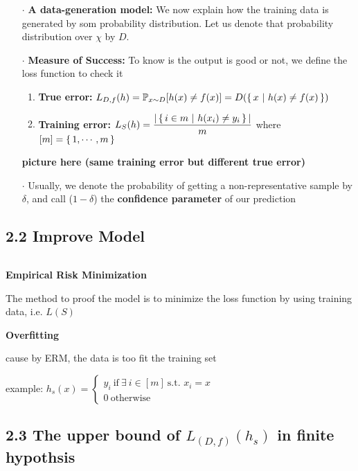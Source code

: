 \begin{enumerate}
	\item[$\cdot$] \textbf{A data-generation model:} We now explain how the training data is generated by som probability distribution. Let us denote that probability distribution over $\chi$ by $D$.
	\item[$\cdot$] \textbf{Measure of Success:} To know is the output is good or not, we define the loss function to check it
	\begin{enumerate}
		\item \textbf{True error:} $L_{D,f}(h) = \mathbb{P}_{x\sim D}[h(x) \neq f(x)] = D(\left\{ \,x ~|~ h(x) \neq f(x) \,\right\})$
		\item \textbf{Training error:} $L_S(h) = \dfrac{|\left\{ \,i \in m ~|~ h(x_i) \neq y_i \,\right\} |}{m}$ where $[m] = \left\{ \,1,\cdots,m \,\right\}$
	\end{enumerate}
	
	\textbf{\color{red} picture here \color{black} (same training error but different true error)}
	
	\item[$\cdot$] Usually, we denote the probability of getting a non-representative sample by $\delta$, and call ($1 - \delta$) the
\textbf{confidence parameter} of our prediction
\end{enumerate}


\subsection*{2.2 Improve Model} $ $

\textbf{Empirical Risk Minimization}

The method to proof the model is to minimize the loss function by using training data, i.e. $L(S)$

\textbf{Overfitting}

cause by ERM, the data is too fit the training set

example: $h_s(x) = \begin{cases}
	y_i~\text{if}~\exists~i \in [m]~\text{s.t. } x_i = x\\
	0~\text{otherwise}
\end{cases}$

\subsection*{2.3 The upper bound of $L_{(D,f)}(h_s)$ in finite hypothsis} $ $\\

